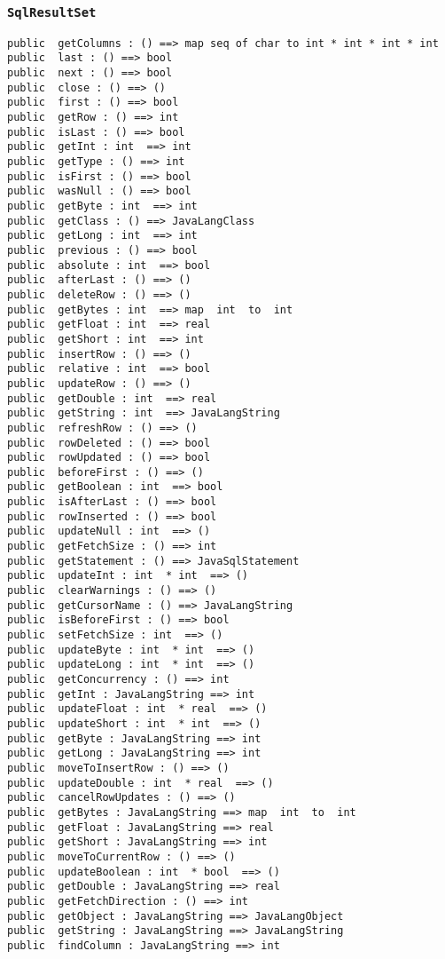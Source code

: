 \documentclass[\pformat,12pt]{article}
\begin{document}
\subsubsection{\texttt{SqlResultSet}}
\begin{small}
\begin{verbatim}
public  getColumns : () ==> map seq of char to int * int * int * int
public  last : () ==> bool
public  next : () ==> bool
public  close : () ==> ()
public  first : () ==> bool
public  getRow : () ==> int
public  isLast : () ==> bool
public  getInt : int  ==> int
public  getType : () ==> int
public  isFirst : () ==> bool
public  wasNull : () ==> bool
public  getByte : int  ==> int
public  getClass : () ==> JavaLangClass
public  getLong : int  ==> int
public  previous : () ==> bool
public  absolute : int  ==> bool
public  afterLast : () ==> ()
public  deleteRow : () ==> ()
public  getBytes : int  ==> map  int  to  int
public  getFloat : int  ==> real
public  getShort : int  ==> int
public  insertRow : () ==> ()
public  relative : int  ==> bool
public  updateRow : () ==> ()
public  getDouble : int  ==> real
public  getString : int  ==> JavaLangString
public  refreshRow : () ==> ()
public  rowDeleted : () ==> bool
public  rowUpdated : () ==> bool
public  beforeFirst : () ==> ()
public  getBoolean : int  ==> bool
public  isAfterLast : () ==> bool
public  rowInserted : () ==> bool
public  updateNull : int  ==> ()
public  getFetchSize : () ==> int
public  getStatement : () ==> JavaSqlStatement
public  updateInt : int  * int  ==> ()
public  clearWarnings : () ==> ()
public  getCursorName : () ==> JavaLangString
public  isBeforeFirst : () ==> bool
public  setFetchSize : int  ==> ()
public  updateByte : int  * int  ==> ()
public  updateLong : int  * int  ==> ()
public  getConcurrency : () ==> int
public  getInt : JavaLangString ==> int
public  updateFloat : int  * real  ==> ()
public  updateShort : int  * int  ==> ()
public  getByte : JavaLangString ==> int
public  getLong : JavaLangString ==> int
public  moveToInsertRow : () ==> ()
public  updateDouble : int  * real  ==> ()
public  cancelRowUpdates : () ==> ()
public  getBytes : JavaLangString ==> map  int  to  int
public  getFloat : JavaLangString ==> real
public  getShort : JavaLangString ==> int
public  moveToCurrentRow : () ==> ()
public  updateBoolean : int  * bool  ==> ()
public  getDouble : JavaLangString ==> real
public  getFetchDirection : () ==> int
public  getObject : JavaLangString ==> JavaLangObject
public  getString : JavaLangString ==> JavaLangString
public  findColumn : JavaLangString ==> int

\end{verbatim}
\end{small}
\end{document}
